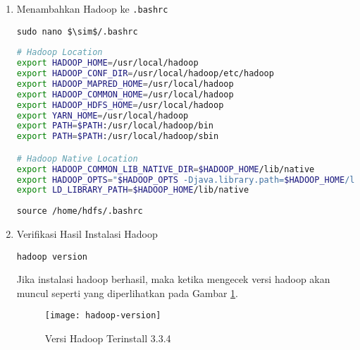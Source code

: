 \documentclass[a4paper]{tufte-handout}
\begin{document}
\begin{enumerate}
\item Menambahkan Hadoop ke {\tt .bashrc}
\begin{lstlisting}[language=Terminal]
 sudo nano $\sim$/.bashrc
\end{lstlisting}

\begin{lstlisting}[language=Bash]
# Hadoop Location
export HADOOP_HOME=/usr/local/hadoop
export HADOOP_CONF_DIR=/usr/local/hadoop/etc/hadoop
export HADOOP_MAPRED_HOME=/usr/local/hadoop
export HADOOP_COMMON_HOME=/usr/local/hadoop
export HADOOP_HDFS_HOME=/usr/local/hadoop
export YARN_HOME=/usr/local/hadoop
export PATH=$PATH:/usr/local/hadoop/bin
export PATH=$PATH:/usr/local/hadoop/sbin

# Hadoop Native Location
export HADOOP_COMMON_LIB_NATIVE_DIR=$HADOOP_HOME/lib/native
export HADOOP_OPTS="$HADOOP_OPTS -Djava.library.path=$HADOOP_HOME/lib/native"
export LD_LIBRARY_PATH=$HADOOP_HOME/lib/native
\end{lstlisting}

\begin{lstlisting}[language=Terminal]
 source /home/hdfs/.bashrc
\end{lstlisting}

\item Verifikasi Hasil Instalasi Hadoop
\begin{lstlisting}[language=Terminal]
 hadoop version
\end{lstlisting}

Jika instalasi hadoop berhasil, maka ketika mengecek versi hadoop akan muncul seperti yang diperlihatkan pada Gambar \ref{gam:hadoop-version}.
\begin{figure}[!ht]
\texttt{[image: hadoop-version]}
\caption{Versi Hadoop Terinstall 3.3.4}
\label{gam:hadoop-version}
\end{figure}
\end{enumerate}
 
\hrulefill

\clearpage
\begin{comment}
\newday{\#7 - 2 Desember 2022 menggantikan 20 Oktober 2022
\footnote{Mahasiswa yang hadir:
\begin{enumerate}
\item Muhammad Munawir
\item Rizki Ilhami
\item Rauzatinur Syah
\item Salsabila Irmanda
\item Adjie Yusmunandar
\item Nurani Harum Fardaniah
\item Cut Opy Mandalisa
\item Resha Russita
\item Taravia Fauzah
\item Adinda Awaliah
\item Jihan Dwi Sarah
\item M. Ikhsan
\item Zulfahmi
\end{enumerate}}}
\end{comment}
\end{document}
